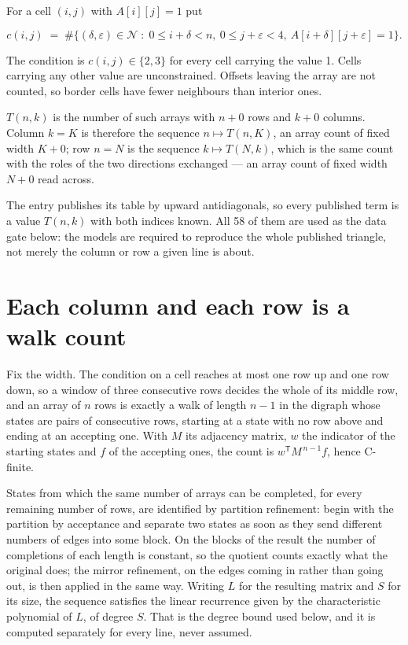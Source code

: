 \documentclass[11pt]{article}
\theoremstyle{definition}
\begin{document}
For a cell $(i,j)$ with $A[i][j] = 1$ put

\[c(i,j) \;=\; \#\bigl\{(\delta,\varepsilon)\in\mathcal{N} \;:\; 0\le i+\delta<n,\ 0\le j+\varepsilon<4,\ A[i+\delta][j+\varepsilon] = 1\bigr\}.\]

The condition is $c(i,j) \in \{2, 3\}$ for every cell carrying the value 1. Cells carrying any other value are unconstrained. Offsets leaving the array are not counted, so border cells have fewer neighbours than interior ones.

$T(n,k)$ is the number of such arrays with $n + 0$ rows and $k + 0$ columns. Column $k = K$ is therefore the sequence $n \mapsto T(n,K)$, an array count of fixed width $K + 0$; row $n = N$ is the sequence $k \mapsto T(N,k)$, which is the same count with the roles of the two directions exchanged --- an array count of fixed width $N + 0$ read across.

The entry publishes its table by upward antidiagonals, so every published term is a value $T(n,k)$ with both indices known. All 58 of them are used as the data gate below: the models are required to reproduce the whole published triangle, not merely the column or row a given line is about.

\section{Each column and each row is a walk count}

Fix the width. The condition on a cell reaches at most one row up and one row down, so a window of three consecutive rows decides the whole of its middle row, and an array of $n$ rows is exactly a walk of length $n-1$ in the digraph whose states are pairs of consecutive rows, starting at a state with no row above and ending at an accepting one. With $M$ its adjacency matrix, $w$ the indicator of the starting states and $f$ of the accepting ones, the count is $w^{\mathsf T}M^{\,n-1}f$, hence C-finite.

States from which the same number of arrays can be completed, for every remaining number of rows, are identified by partition refinement: begin with the partition by acceptance and separate two states as soon as they send different numbers of edges into some block. On the blocks of the result the number of completions of each length is constant, so the quotient counts exactly what the original does; the mirror refinement, on the edges coming in rather than going out, is then applied in the same way. Writing $L$ for the resulting matrix and $S$ for its size, the sequence satisfies the linear recurrence given by the characteristic polynomial of $L$, of degree $S$. That is the degree bound used below, and it is computed separately for every line, never assumed.
\end{document}
